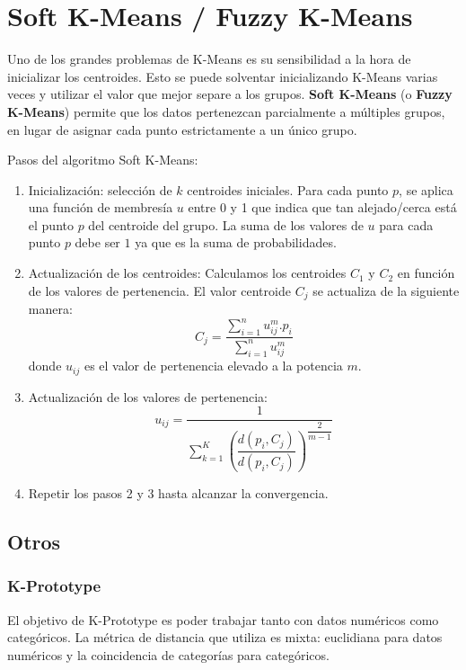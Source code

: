 \section{Soft K-Means / Fuzzy K-Means}
Uno de los grandes problemas de K-Means es su sensibilidad a la hora de inicializar los centroides. Esto se puede solventar inicializando K-Means varias veces y utilizar el valor que mejor separe a los grupos. \textbf{Soft K-Means} (o \textbf{Fuzzy K-Means}) permite que los datos pertenezcan parcialmente a múltiples grupos, en lugar de asignar cada punto estrictamente a un único grupo.

Pasos del algoritmo Soft K-Means:

\begin{enumerate}
    \item Inicialización: selección de $k$ centroides iniciales. Para cada punto $p$, se aplica una función de membresía $u$ entre 0 y 1 que indica que tan alejado/cerca está el punto $p$ del centroide del grupo. La suma de los valores de $u$ para cada punto $p$ debe ser $1$ ya que es la suma de probabilidades.

    \item Actualización de los centroides: Calculamos los centroides $C_1$ y $C_2$ en función de los valores de pertenencia. El valor centroide $C_j$ se actualiza de la siguiente manera:
    \begin{equation*}
        C_j= \dfrac{\sum_{i=1}^nu_{ij}^m.p_{i}}{\sum_{i=1}^nu_{ij}^m}
    \end{equation*}
    donde $u_{ij}$ es el valor de pertenencia elevado a la potencia $m$.

    \item Actualización de los valores de pertenencia:
    \begin{equation*}
        u_{ij}=\dfrac{1}{\sum_{k=1}^K\left(\dfrac{d(p_i,C_j)}{d\left(p_i,C_j\right)}\right)^{\dfrac{2}{m-1}}}
    \end{equation*}
    
    \item Repetir los pasos 2 y 3 hasta alcanzar la convergencia.
    
\end{enumerate}

\subsection{Otros}
\subsubsection{K-Prototype}
El objetivo de K-Prototype es poder trabajar tanto con datos numéricos como categóricos. La métrica de distancia que utiliza es mixta: euclidiana para datos numéricos y la coincidencia de categorías para categóricos. 


